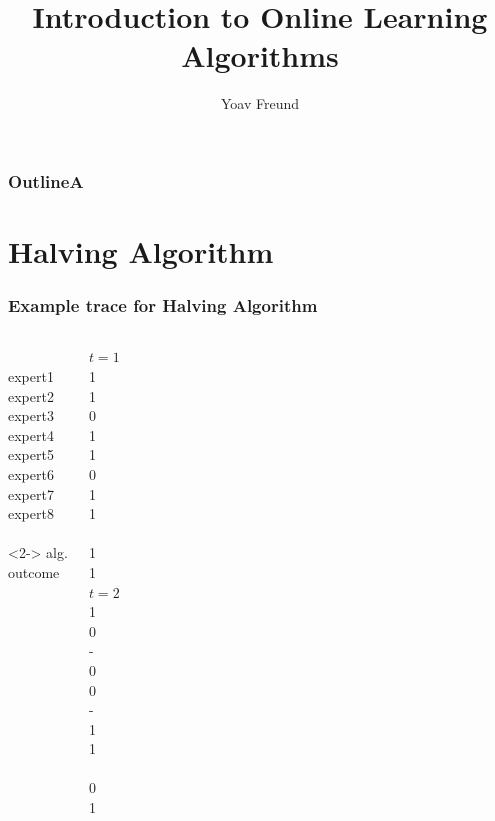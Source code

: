 \documentclass[handout]{beamer}
\title[Introduction] %
{Introduction to Online Learning Algorithms}
\author[Freund] %
{Yoav Freund}
\institute[Universities of Somewhere and Elsewhere] %
\begin{document}
\begin{frame}
  \titlepage
\end{frame}

\begin{frame}
  \frametitle{OutlineA}
  \tableofcontents
\end{frame}

\section{Halving Algorithm}

\begin{frame} 
\frametitle{Example trace for Halving Algorithm} 


\begin{columns} 
\column[t]{3cm}
~ \\ expert1\\ expert2\\ expert3\\ expert4 \\ expert5\\ expert6\\ expert7\\ expert8 \\ ~\\
\onslide<{2}->\color<2>{red} alg.\\
 outcome 

\column[t]{1cm}
 $t=1$   \\ 1 \\ 1 \\ 0  \\ 1 \\ 1 \\ 0 \\ 1  \\ 1 \\ ~ \\
\color<5>{red} 1 \\
 1 \\
		   			   
\column[t]{1cm}	   		   
 $t=2$   \\ 1 \\ 0 \\ -  \\ 0 \\ 0 \\ - \\ 1  \\ 1 \\ ~ \\
\color<8>{red} 0 \\
 1 \\


\end{columns}
\end{frame}
\end{document}
